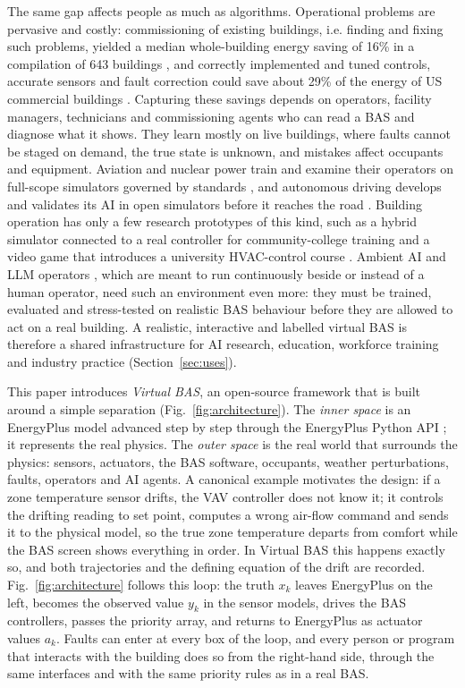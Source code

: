 \documentclass[preprint,12pt,authoryear=false]{elsarticle}
\begin{document}
The same gap affects people as much as algorithms. Operational problems are pervasive and costly: commissioning of
existing buildings, i.e. finding and fixing such problems, yielded a median whole-building energy saving of 16\% in a
compilation of 643 buildings \cite{mills2011commissioning}, and correctly implemented and tuned controls, accurate
sensors and fault correction could save about 29\% of the energy of US commercial buildings
\cite{fernandez2017controls}. Capturing these savings depends on operators, facility managers, technicians and
commissioning agents who can read a BAS and diagnose what it shows. They learn mostly on live buildings, where faults
cannot be staged on demand, the true state is unknown, and mistakes affect occupants and equipment. Aviation and
nuclear power train and examine their operators on full-scope simulators governed by standards \cite{ans35}, and
autonomous driving develops and validates its AI in open simulators before it reaches the road
\cite{dosovitskiy2017carla}. Building operation has only a few research prototypes of this kind, such as a hybrid
simulator connected to a real controller for community-college training \cite{xu2004training} and a video game that
introduces a university HVAC-control course \cite{johra2020geenie}. Ambient AI and LLM operators
\cite{zhang2024llmbem,zhang2024llmcontrol}, which are meant to run continuously beside or instead of a human operator,
need such an environment even more: they must be trained, evaluated and stress-tested on realistic BAS behaviour before
they are allowed to act on a real building. A realistic, interactive and labelled virtual BAS is therefore a shared
infrastructure for AI research, education, workforce training and industry practice (Section~\ref{sec:uses}).

This paper introduces \emph{Virtual BAS}, an open-source framework that is built around a simple separation
(Fig.~\ref{fig:architecture}). The \emph{inner space} is an EnergyPlus model advanced step by step through the
EnergyPlus Python API \cite{energyplusapi}; it represents the real physics. The \emph{outer space} is the real world
that surrounds the physics: sensors, actuators, the BAS software, occupants, weather perturbations, faults, operators
and AI agents. A canonical example motivates the design: if a zone temperature sensor drifts, the VAV controller does
not know it; it controls the drifting reading to set point, computes a wrong air-flow command and sends it to the
physical model, so the true zone temperature departs from comfort while the BAS screen shows everything in order. In
Virtual BAS this happens exactly so, and both trajectories and the defining equation of the drift are recorded.
Fig.~\ref{fig:architecture} follows this loop: the truth $x_k$ leaves EnergyPlus on the left, becomes the observed
value $y_k$ in the sensor models, drives the BAS controllers, passes the priority array, and returns to EnergyPlus as
actuator values $a_k$. Faults can enter at every box of the loop, and every person or program that interacts with the
building does so from the right-hand side, through the same interfaces and with the same priority rules as in a real
BAS.
\end{document}
